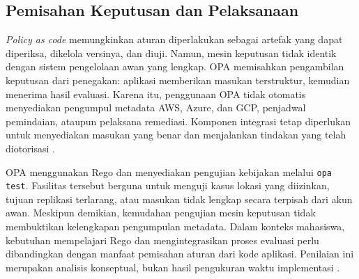 \subsection{Pemisahan Keputusan dan Pelaksanaan}

\textit{Policy as code} memungkinkan aturan diperlakukan sebagai artefak yang dapat diperiksa, dikelola versinya, dan diuji. Namun, mesin keputusan tidak identik dengan sistem pengelolaan awan yang lengkap. OPA memisahkan pengambilan keputusan dari penegakan: aplikasi memberikan masukan terstruktur, kemudian menerima hasil evaluasi. Karena itu, penggunaan OPA tidak otomatis menyediakan pengumpul metadata AWS, Azure, dan GCP, penjadwal pemindaian, ataupun pelaksana remediasi. Komponen integrasi tetap diperlukan untuk menyediakan masukan yang benar dan menjalankan tindakan yang telah diotorisasi \autocite{b2c_opaOverview}.

OPA menggunakan Rego dan menyediakan pengujian kebijakan melalui \texttt{opa test}. Fasilitas tersebut berguna untuk menguji kasus lokasi yang diizinkan, tujuan replikasi terlarang, atau masukan tidak lengkap secara terpisah dari akun awan. Meskipun demikian, kemudahan pengujian mesin keputusan tidak membuktikan kelengkapan pengumpulan metadata. Dalam konteks mahasiswa, kebutuhan mempelajari Rego dan mengintegrasikan proses evaluasi perlu dibandingkan dengan manfaat pemisahan aturan dari kode aplikasi. Penilaian ini merupakan analisis konseptual, bukan hasil pengukuran waktu implementasi \autocite{b2c_opaOverview,b2c_opaTesting}.

